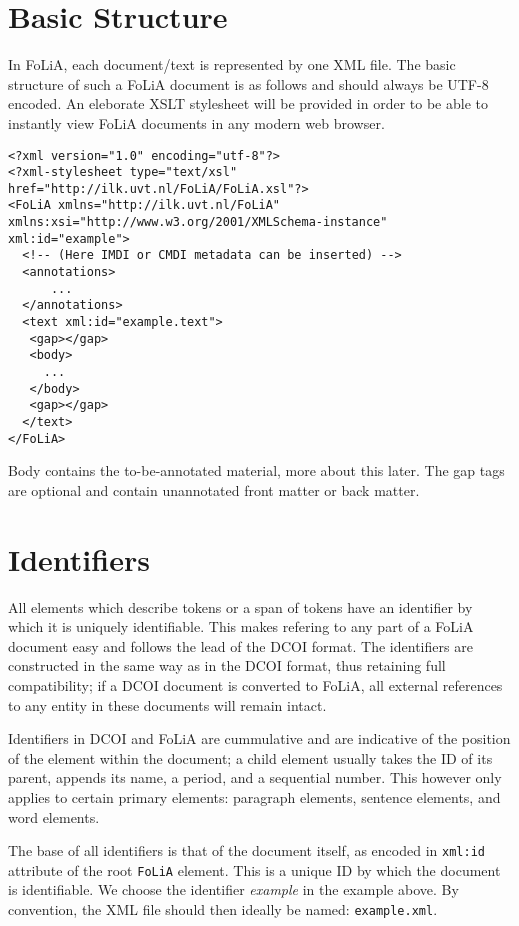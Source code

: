 \documentclass[a4paper,12pt]{article}
\begin{document}
\section{Basic Structure}

In FoLiA, each document/text is represented by one XML file. The basic structure of such a FoLiA document is as follows and should always be UTF-8 encoded. An eleborate XSLT stylesheet will be provided in order to be able to instantly view FoLiA documents in any modern web browser.

\begin{verbatim}
<?xml version="1.0" encoding="utf-8"?>
<?xml-stylesheet type="text/xsl" href="http://ilk.uvt.nl/FoLiA/FoLiA.xsl"?>
<FoLiA xmlns="http://ilk.uvt.nl/FoLiA" xmlns:xsi="http://www.w3.org/2001/XMLSchema-instance" xml:id="example">
  <!-- (Here IMDI or CMDI metadata can be inserted) -->
  <annotations>
      ...
  </annotations>    
  <text xml:id="example.text">
   <gap></gap>
   <body>
     ...
   </body>
   <gap></gap>
  </text>
</FoLiA>  
\end{verbatim}

Body contains the to-be-annotated material, more about this later. The gap tags are optional and contain unannotated front matter or back matter.

\section{Identifiers}

All elements which describe tokens or a span of tokens have an identifier by which it is uniquely identifiable. This makes refering to any part of a FoLiA document easy and follows the lead of the DCOI format. The identifiers are constructed in the same way as in the DCOI format, thus retaining full compatibility; if a DCOI document is converted to FoLiA, all external references to any entity in these documents will remain intact.

Identifiers in DCOI and FoLiA are cummulative and are indicative of the position of the element within the document; a child element usually takes the ID of its parent, appends its name, a period, and a sequential number. This however only applies to certain primary elements: paragraph elements, sentence elements, and word elements.

The base of all identifiers is that of the document itself, as encoded in \texttt{xml:id} attribute of the root \texttt{FoLiA} element. This is a unique ID by which the document is identifiable. We choose the identifier \emph{example} in the example above. By convention, the XML file should then ideally be named: \texttt{example.xml}.
\end{document}

